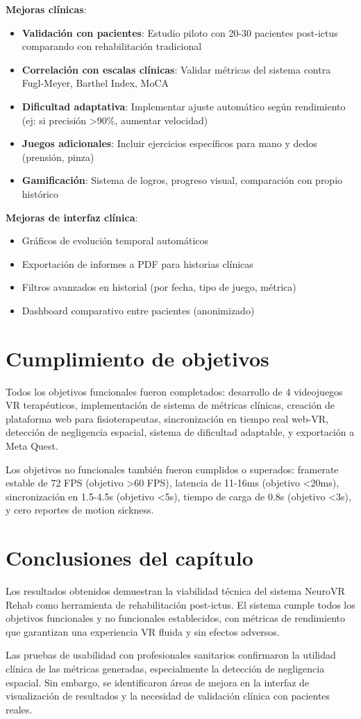 \textbf{Mejoras clínicas}:
\begin{itemize}
    \item \textbf{Validación con pacientes}: Estudio piloto con 20-30 pacientes post-ictus comparando con rehabilitación tradicional
    \item \textbf{Correlación con escalas clínicas}: Validar métricas del sistema contra Fugl-Meyer, Barthel Index, MoCA
    \item \textbf{Dificultad adaptativa}: Implementar ajuste automático según rendimiento (ej: si precisión >90\%, aumentar velocidad)
    \item \textbf{Juegos adicionales}: Incluir ejercicios específicos para mano y dedos (prensión, pinza)
    \item \textbf{Gamificación}: Sistema de logros, progreso visual, comparación con propio histórico
\end{itemize}

\textbf{Mejoras de interfaz clínica}:
\begin{itemize}
    \item Gráficos de evolución temporal automáticos
    \item Exportación de informes a PDF para historias clínicas
    \item Filtros avanzados en historial (por fecha, tipo de juego, métrica)
    \item Dashboard comparativo entre pacientes (anonimizado)
\end{itemize}

\section{Cumplimiento de objetivos}

Todos los objetivos funcionales fueron completados: desarrollo de 4 videojuegos VR terapéuticos, implementación de sistema de métricas clínicas, creación de plataforma web para fisioterapeutas, sincronización en tiempo real web-VR, detección de negligencia espacial, sistema de dificultad adaptable, y exportación a Meta Quest.

Los objetivos no funcionales también fueron cumplidos o superados: framerate estable de 72 FPS (objetivo >60 FPS), latencia de 11-16ms (objetivo <20ms), sincronización en 1.5-4.5s (objetivo <5s), tiempo de carga de 0.8s (objetivo <3s), y cero reportes de motion sickness.

\section{Conclusiones del capítulo}

Los resultados obtenidos demuestran la viabilidad técnica del sistema NeuroVR Rehab como herramienta de rehabilitación post-ictus. El sistema cumple todos los objetivos funcionales y no funcionales establecidos, con métricas de rendimiento que garantizan una experiencia VR fluida y sin efectos adversos.

Las pruebas de usabilidad con profesionales sanitarios confirmaron la utilidad clínica de las métricas generadas, especialmente la detección de negligencia espacial. Sin embargo, se identificaron áreas de mejora en la interfaz de visualización de resultados y la necesidad de validación clínica con pacientes reales.
